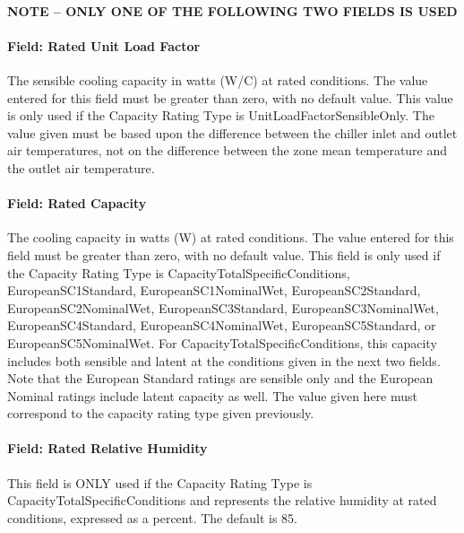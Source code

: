 \paragraph{NOTE -- ONLY ONE OF THE FOLLOWING TWO FIELDS IS USED}\label{note-only-one-of-the-following-two-fields-is-used}

\paragraph{Field: Rated Unit Load Factor}\label{field-rated-unit-load-factor}

The sensible cooling capacity in watts (W/C) at rated conditions. The value entered for this field must be greater than zero, with no default value. This value is only used if the Capacity Rating Type is UnitLoadFactorSensibleOnly. The value given must be based upon the difference between the chiller inlet and outlet air temperatures, not on the difference between the zone mean temperature and the outlet air temperature.

\paragraph{Field: Rated Capacity}\label{field-rated-capacity-001}

The cooling capacity in watts (W) at rated conditions. The value entered for this field must be greater than zero, with no default value. This field is only used if the Capacity Rating Type is CapacityTotalSpecificConditions, EuropeanSC1Standard, EuropeanSC1NominalWet, EuropeanSC2Standard, EuropeanSC2NominalWet, EuropeanSC3Standard, EuropeanSC3NominalWet, EuropeanSC4Standard, EuropeanSC4NominalWet, EuropeanSC5Standard, or EuropeanSC5NominalWet. For CapacityTotalSpecificConditions, this capacity includes both sensible and latent at the conditions given in the next two fields.~ Note that the European Standard ratings are sensible only and the European Nominal ratings include latent capacity as well. The value given here must correspond to the capacity rating type given previously.

\paragraph{Field: Rated Relative Humidity}\label{field-rated-relative-humidity}

This field is ONLY used if the Capacity Rating Type is CapacityTotalSpecificConditions and represents the relative humidity at rated conditions, expressed as a percent. The default is 85.

